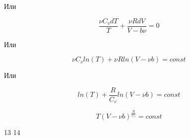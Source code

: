 \documentclass[a4paper,14pt]{article}
\theoremstyle{plain} %
\theoremstyle{definition} %
\theoremstyle{remark} %
\begin{document}
Или 

\begin{equation}
	\frac{\nu C_v d T}{T} + \frac{\nu R d V}{V - b \nu} = 0
\end{equation}

Или

\begin{equation}
	\nu C_v ln (T) + \nu R ln (V - \nu b) = const
\end{equation}

Или 

\begin{equation}
	ln (T) + \frac{R}{C_v} ln (V - \nu b) = const
\end{equation}

\begin{equation}
	T(V - \nu b)^{\frac{R}{C_v}} = const
\end{equation}

\newpage

13
14
\end{document}
